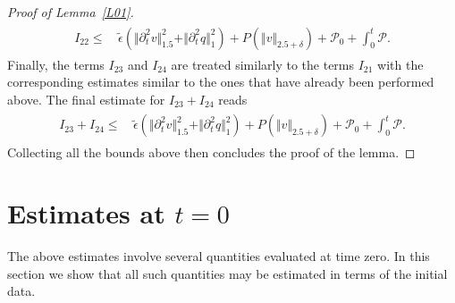 \documentclass[10pt,reqno]{amsart}
\makeatletter
\theoremstyle{plain}
\theoremstyle{definition}
\numberwithin{equation}{section}
\newcommand{\ccP}{\mathscr{P}}
\newcommand{\ccPz}{\mathscr{P}_0}
\newcommand{\Ga}{\Gamma}
\newcommand{\de}{\delta}
\newcommand{\norm}[1]{\Vert#1\Vert}
\def\paragraph{\@startsection{paragraph}{4}%
  \z@\z@{-\fontdimen2\font}%
  {\normalfont\it}}
\makeatother
\begin{document}
\begin{proof}[Proof of Lemma~\ref{L01}]
\begin{align}
\begin{split}
I_{22} \leq &
\, 
\widetilde{\epsilon} ( \norm{\partial^2_t v }^2_{1.5} + \norm{\partial^2_t q}^2_1 )
+ P(  \norm{v}_{2.5+\de})
+ \ccPz
+
\int_0^t \ccP
   .
\end{split}
\label{estimate_I_22}
\end{align}
Finally, the 
terms $I_{23}$ and $I_{24}$ 
are treated
similarly to the terms $I_{21}$
with the corresponding estimates similar to the ones that have already been performed
above. The final estimate
for  $I_{23}+I_{24}$ reads
\begin{align}
\begin{split}
I_{23} + I_{24} \leq &  \,
\widetilde{\epsilon} (\norm{\partial^2_t v}^2_{1.5}  + \norm{\partial^2_t q}^2_1   ) 
 + P(\norm{v}_{2.5+\de}) 
 +\ccPz
 + 
\int_0^t \ccP.
\end{split}
\label{estimate_I_23_24}
\end{align}
Collecting all the bounds above then concludes the proof of the
lemma.
\end{proof}

\section{Estimates at $t=0$\label{section_time_zero}}
The above estimates involve several quantities evaluated at time zero. In this section we show
that all such quantities may be estimated in terms of the initial data.
\end{document}
